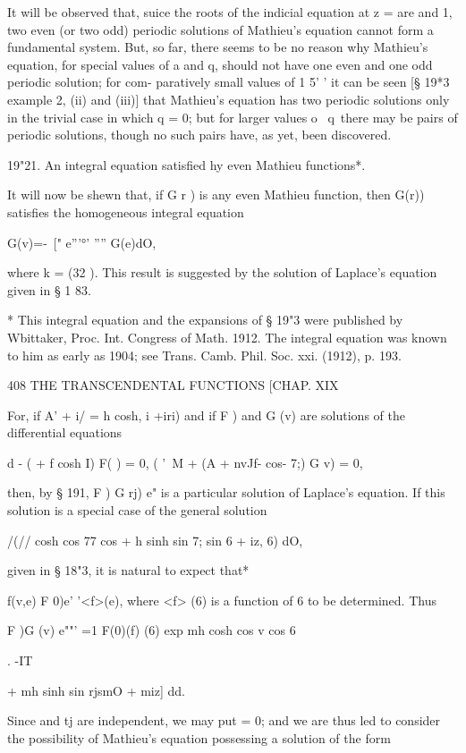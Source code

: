It will be observed that, suice the roots of the indicial equation at
z = are and 1, two even (or two odd) periodic solutions of Mathieu's
equation cannot form a fundamental system. But, so far, there seems to
be no reason why Mathieu's equation, for special values of a and q,
should not have one even and one odd periodic solution; for com-
paratively small values of 1 5' ' it can be seen [§ 19*3 example 2,
(ii) and (iii)] that Mathieu's equation has two periodic solutions
only in the trivial case in which q = 0; but for larger values o \ q\
there may be pairs of periodic solutions, though no such pairs have,
as yet, been discovered.

19"21. An integral equation satisfied hy even Mathieu functions*.

It will now be shewn that, if G r ) is any even Mathieu function, then
G(r)) satisfies the homogeneous integral equation

G(v)=-\ [" e'''°' '''' G(e)dO,

where k = \/(32 ). This result is suggested by the solution of
Laplace's equation given in § 1 83.

* This integral equation and the expansions of § 19"3 were published
by Wbittaker, Proc. Int. Congress of Math. 1912. The integral equation
was known to him as early as 1904; see Trans. Camb. Phil. Soc. xxi.
(1912), p. 193.

408 THE TRANSCENDENTAL FUNCTIONS [CHAP. XIX

For, if A' + i/ = h cosh, i +iri) and if F ) and G (v) are solutions
of the differential equations

 d - ( + f cosh I) F( ) = 0, ( '\ M + (A + nvJf- cos- 7;) G v) = 0,

then, by § 191, F ) G rj) e" is a particular solution of Laplace's
equation. If this solution is a special case of the general solution

/(// cosh cos 77 cos + h sinh sin 7; sin 6 + iz, 6) dO,

given in § 18"3, it is natural to expect that*

f(v,e) F 0)e' '<f>(e), where <f> (6) is a function of 6 to be
determined. Thus

F )G (v) e""' =1 F(0)(f) (6) exp mh cosh cos v cos 6

. -IT

+ mh sinh sin rjsmO + miz] dd.

Since and tj are independent, we may put = 0; and we are thus led to
consider the possibility of Mathieu's equation possessing a solution
of the form

